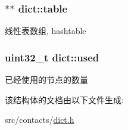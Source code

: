 \subsubsection[{\texorpdfstring{table}{table}}]{$\ast$$\ast$ dict\+::table}\hypertarget{structdict_a337bb4468f938b34de9173822a143b80}{}\label{structdict_a337bb4468f938b34de9173822a143b80}
线性表数组, hashtable 
\subsubsection[{\texorpdfstring{used}{used}}]{\setlength{\rightskip}{0pt plus 5cm}uint32\+\_\+t dict\+::used}\hypertarget{structdict_abd9079c1d7e55aee509c93f4239f5690}{}\label{structdict_abd9079c1d7e55aee509c93f4239f5690}
已经使用的节点的数量 

该结构体的文档由以下文件生成\+:\begin{DoxyCompactItemize}
\item 
src/contacts/\hyperlink{dict_8h}{dict.\+h}\end{DoxyCompactItemize}
